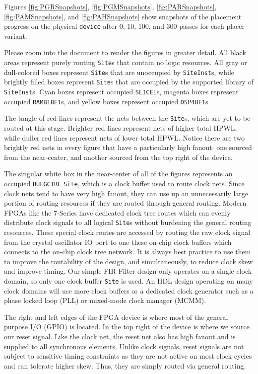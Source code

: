 Figures \ref{fig:PGRSnapshots}, \ref{fig:PGMSnapshots}, \ref{fig:PARSnapshots}, \ref{fig:PAMSnapshots}, and \ref{fig:PAHSnapshots} show snapshots of the placement progress on the physical \texttt{device} after 0, 10, 100, and 300 passes for each placer variant.

Please zoom into the document to render the figures in greater detail.
All black areas represent purely routing \texttt{Site}s that contain no logic resources. 
All gray or dull-colored boxes represent \texttt{Site}s that are unoccupied by \texttt{SiteInst}s, while brightly filled boxes represent \texttt{Site}s that are occupied by the supported library of \texttt{SiteInst}s.
Cyan boxes represent occupied \texttt{SLICEL}s, magenta boxes represent occupied \texttt{RAMB18E1}s, and yellow boxes represent occupied \texttt{DSP48E1}s.

The tangle of red lines represent the nets between the \texttt{Site}s, which are yet to be routed at this stage. 
Brighter red lines represent nets of higher total HPWL, while duller red lines represent nets of lower total HPWL.
Notice there are two brightly red nets in every figure that have a particularly high fanout:
one sourced from the near-center, and another sourced from the top right of the device. 

The singular white box in the near-center of all of the figures represents an occupied \texttt{BUFGCTRL} \texttt{Site}, which is a clock buffer used to route clock nets. 
Since clock nets tend to have very high fanout, they can use up an unnecessarily large portion of routing resources if they are routed through general routing.
Modern FPGAs like the 7-Series have dedicated clock tree routes which can evenly distribute clock signals to all logical \texttt{Site}s without burdening the general routing resources.
These special clock routes are accessed by routing the raw clock signal from the crystal oscillator IO port to one these on-chip clock buffers which connects to the on-chip clock tree network.
It is always best practice to use them to improve the routability of the design, and simultaneously, to reduce clock skew and improve timing. 
Our simple FIR Filter design only operates on a single clock domain, so only one clock buffer \texttt{Site} is used. 
An HDL design operating on many clock domains will use more clock buffers or a dedicated clock generator such as a phase locked loop (PLL) or mixed-mode clock manager (MCMM).

The right and left edges of the FPGA device is where most of the general purpose I/O (GPIO) is located. 
In the top right of the device is where we source our reset signal. 
Like the clock net, the reset net also has high fanout and is supplied to all synchronous elements.
Unlike clock signals, reset signals are not subject to sensitive timing constraints as they are not active on most clock cycles and can tolerate higher skew.
Thus, they are simply routed via general routing.

